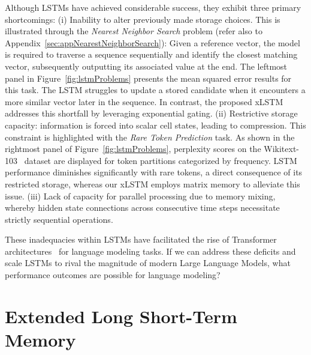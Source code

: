 Although LSTMs have achieved considerable success, they exhibit three primary shortcomings: (i) Inability to alter previously made storage choices. This is illustrated through the 
{\it Nearest Neighbor Search} problem (refer also to Appendix~\ref{sec:appNearestNeighborSearch}): 
Given a reference vector, the model is required to traverse a sequence sequentially and identify the closest matching vector, subsequently outputting its associated value at the end. The leftmost panel in Figure~\ref{fig:lstmProblems} presents the mean squared error results for this task. The LSTM struggles to update a stored candidate when it encounters a more similar vector later in the sequence. In contrast, the proposed xLSTM addresses this shortfall by leveraging exponential gating. (ii) Restrictive storage capacity: information is forced into scalar cell states, leading to compression. This constraint is highlighted with the {\it Rare Token Prediction} task. As shown in the rightmost panel of Figure~\ref{fig:lstmProblems}, perplexity scores on the Wikitext-103~\citep{Merity:17} dataset are displayed for token partitions categorized by frequency. LSTM performance diminishes significantly with rare tokens, a direct consequence of its restricted storage, whereas our xLSTM employs matrix memory to alleviate this issue. (iii) Lack of capacity for parallel processing due to memory mixing, whereby hidden state connections across consecutive time steps necessitate strictly sequential operations.

These inadequacies within LSTMs have facilitated the rise of Transformer architectures~\citep{Vaswani:17} for language modeling tasks. If we can address these deficits and scale LSTMs to rival the magnitude of modern Large Language Models, what performance outcomes are possible for language modeling?

\section{Extended Long Short-Term Memory}
\label{sec:xLSTM}

